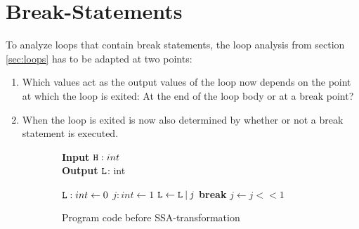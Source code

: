 \section{Break-Statements}
To analyze loops that contain break statements, the loop analysis from section \ref{sec:loops} has to be adapted at two points:
\begin{enumerate}
    \item Which values act as the output values of the loop now depends on the point at which the loop is exited: At the end of the loop body or at a break point?
    \item When the loop is exited is now also determined by whether or not a break statement is executed.
\end{enumerate}

\begin{figure}
\begin{subfigure}{.5\textwidth}
    \centering
    \begin{algorithm}[H]
        \hspace*{\algorithmicindent} \textbf{Input} $\mathtt{H}: int$ \\
        \hspace*{\algorithmicindent} \textbf{Output} $\mathtt{L}$: int
        \begin{algorithmic}[1]
        \State $\mathtt{L}: int \leftarrow 0$
        \State $j: int \leftarrow 1$
                \State $\mathtt{L} \leftarrow \mathtt{L} \: | \: j$
                    \State \textbf{break}
                \EndIf
                \State $j \leftarrow j << 1$
            \EndWhile
    \end{algorithmic} 
    \end{algorithm}
    \caption{Program code before SSA-transformation}\label{prog:break}
\end{subfigure}
\hfill
\begin{subfigure}{.4\textwidth}
    \centering
\end{subfigure}
\end{figure}
